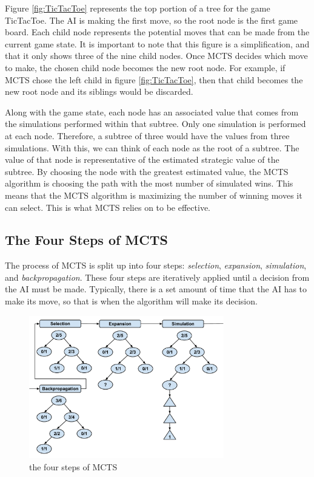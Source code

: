 \documentclass{sig-alternate}
\begin{document}
Figure \ref{fig:TicTacToe} represents the top portion of a tree for the game TicTacToe. The AI is making the first move, so the root node is the first game board. Each child node represents the potential moves that can be made from the current game state. It is important to note that this figure is a simplification, and that it only shows three of the nine child nodes. Once MCTS decides which move to make, the chosen child node becomes the new root node. For example, if MCTS chose the left child in figure \ref{fig:TicTacToe}, then that child becomes the new root node and its siblings would be discarded.

Along with the game state, each node has an associated value that comes from the simulations performed within that subtree. Only one simulation is performed at each node. Therefore, a subtree of three would have the values from three simulations. With this, we can think of each node as the root of a subtree. The value of that node is representative of the estimated strategic value of the subtree. By choosing the node with the greatest estimated value, the MCTS algorithm is choosing the path with the most number of simulated wins. This means that the MCTS algorithm is maximizing the number of winning moves it can select. This is what MCTS relies on to be effective.   

\subsection{The Four Steps of MCTS}
The process of MCTS is split up into four steps: \textit{selection}, \textit{expansion}, \textit{simulation}, and \textit{backpropagation}. These four steps are iteratively applied until a decision from the AI must be made. Typically, there is a set amount of time that the AI has to make its move, so that is when the algorithm will make its decision.

\begin{figure}[h]
	\includegraphics[width=8.5cm]{MCTSFourStepProcess.pdf}
	\centering
	\caption{the four steps of MCTS}
	\label{fig:FourSteps}
\end{figure}
\end{document}
